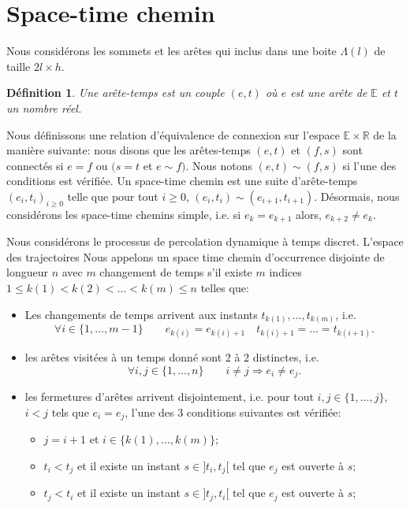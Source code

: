 \documentclass[titlepage,a4paper,12pt]{article}
\newcounter{def}
\newtheorem{pointTS}[def]{Définition}
\begin{document}
\section{Space-time chemin}
Nous considérons les sommets et les arêtes qui inclus dans une boite $\Lambda(l)$ de taille $2l\times h$.
\begin{pointTS}
Une arête-temps est un couple $(e,t)$ où $e$ est une arête de $\mathbb{E}$ et $t$ un nombre réel. 
\end{pointTS}

Nous définissons une relation d'équivalence de connexion sur l'espace $\mathbb{E}\times \mathbb{R}$ de la manière suivante: nous disons que les arêtes-temps $(e,t)$ et $(f,s)$ sont connectés si $e=f$ ou $(s=t$ et $e\sim f)$. Nous notons $(e,t)\sim(f,s)$ si l'une des conditions est vérifiée. Un space-time chemin est une suite d'arête-temps $(e_i,t_i)_{i\geqslant 0}$ telle que pour tout $i\geqslant 0$, $(e_i,t_i)\sim(e_{i+1},t_{i+1})$. Désormais, nous considérons les space-time chemins simple, i.e. si $e_k = e_{k+1}$ alors, $e_{k+2} \neq e_k$.

Nous considérons le processus de percolation dynamique à temps discret. L'espace des trajectoires 
Nous appelons un space time chemin d'occurrence disjointe de longueur $n$ avec $m$ changement de temps s'il existe $m$ indices $1\leqslant k(1)< k(2) < \dots < k(m) \leqslant n$ telles que:
\begin{itemize}[label = $\bullet$, leftmargin = *]
\item Les changements de temps arrivent aux instants $t_{k(1)},\dots, t_{k(m)}$, i.e.
$$\forall i\in \{1,\dots, m-1\} \qquad e_{k(i)} = e_{k(i)+1} \quad t_{k(i)+1} =\dots = t_{k(i+1)}.
$$
\item les arêtes visitées à un temps donné sont 2 à 2 distinctes, i.e.
$$ \forall i,j \in \{1,\dots, n\} \qquad i\neq j \Rightarrow e_i\neq e_j.
$$
\item les fermetures d'arêtes arrivent disjointement, i.e. pour tout $i,j\in \{1,\dots, j\}$, $i<j$ tels que $e_i = e_j$, l'une des 3 conditions suivantes est vérifiée:
\begin{itemize}
\item $j=i+1$ et $i\in \{k(1),\dots, k(m)\}$;
\item $t_i< t_j$ et il existe un instant $s\in ]t_i,t_j[$ tel que $e_j$ est ouverte à $s$;
\item $t_j< t_i$ et il existe un instant $s\in ]t_j,t_i[$ tel que $e_j$ est ouverte à $s$;
\end{itemize}
\end{itemize}
\end{document}
